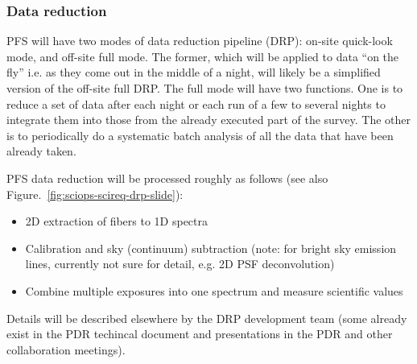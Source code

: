 \documentclass[a4paper,notitlepage]{article}
\begin{document}
\subsubsection{Data reduction}
\label{datareduction}

PFS will have two modes of data reduction pipeline (DRP): on-site
quick-look mode, and off-site full mode. The former, which will be
applied to data ``on the fly'' i.e. as they come out in the middle of a
night, will likely be a simplified version of the off-site full DRP. The
full mode will have two functions. One is to reduce a set of data after
each night or each run of a few to several nights to integrate them into
those from the already executed part of the survey. The other is to
periodically do a systematic batch analysis of all the data that have
been already taken.

PFS data reduction will be processed roughly as follows (see also
Figure.~\ref{fig:sciops-scireq-drp-slide}): 

\begin{itemize}
  \item 2D extraction of fibers to 1D spectra
  \item Calibration and sky (continuum) subtraction (note: for bright sky 
    emission lines, currently not sure for detail, e.g. 2D PSF deconvolution)
  \item Combine multiple exposures into one spectrum and measure scientific 
    values
\end{itemize}

Details will be described elsewhere by the DRP development team (some
already exist in the PDR techincal document and presentations in the PDR
and other collaboration meetings).

\end{document}
